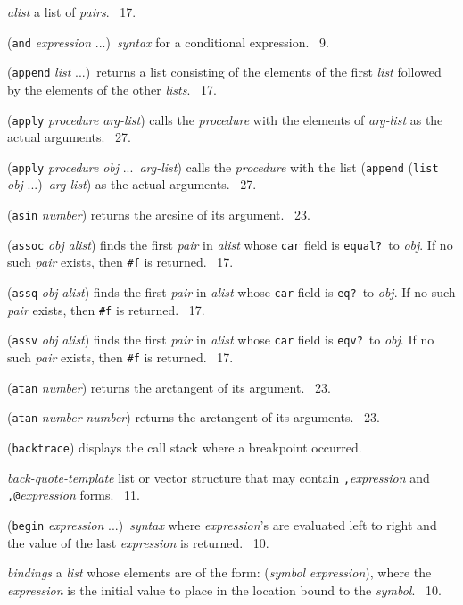 \documentclass[10pt,twocolumn]{article}
\begin{document}
\emph{alist} a list of \emph{pairs}.  \RRRRRS~17.

(\texttt{and} \emph{expression} ...)\ \emph{syntax} for a conditional
expression.  \RRRRRS~9.

(\texttt{append} \emph{list} ...)\ returns a list consisting of the
elements of the first \emph{list} followed by the elements of the
other \emph{lists}.  \RRRRRS~17.

(\texttt{apply} \emph{procedure} \emph{arg-list}) calls the
\emph{procedure} with the elements of \emph{arg-list} as the actual
arguments.  \RRRRRS~27.

(\texttt{apply} \emph{procedure} \emph{obj} ...\ \emph{arg-list})
calls the \emph{procedure} with the list (\texttt{append}
(\texttt{list} \emph{obj} ...)\ \emph{arg-list}) as the actual
arguments.  \RRRRRS~27.

(\texttt{asin} \emph{number}) returns the arcsine of its argument.
\RRRRRS~23.

(\texttt{assoc} \emph{obj} \emph{alist}) finds the first \emph{pair}
in \emph{alist} whose \texttt{car} field is \texttt{equal?}\ to
\emph{obj}.  If no such \emph{pair} exists, then \texttt{\#f} is
returned.  \RRRRRS~17.

(\texttt{assq} \emph{obj} \emph{alist}) finds the first \emph{pair} in
\emph{alist} whose \texttt{car} field is \texttt{eq?}\ to \emph{obj}.
If no such \emph{pair} exists, then \texttt{\#f} is returned.
\RRRRRS~17.

(\texttt{assv} \emph{obj} \emph{alist}) finds the first \emph{pair} in
\emph{alist} whose \texttt{car} field is \texttt{eqv?}\ to \emph{obj}.
If no such \emph{pair} exists, then \texttt{\#f} is returned.
\RRRRRS~17.

(\texttt{atan} \emph{number}) returns the arctangent of its argument.
\RRRRRS~23.

(\texttt{atan} \emph{number} \emph{number}) returns the arctangent of
its arguments.  \RRRRRS~23.

(\texttt{backtrace}) displays the call stack where a breakpoint
occurred.

\emph{back-quote-template} list or vector structure that may contain
\texttt{,}\emph{expression} and \texttt{,@}\emph{expression} forms.
\RRRRRS~11.

(\texttt{begin} \emph{expression} ...)\ \emph{syntax} where
\emph{expression}'s are evaluated left to right and the value of the
last \emph{expression} is returned. \RRRRRS~10.

\emph{bindings} a \emph{list} whose elements are of the form:
(\emph{symbol} \emph{expression}), where the \emph{expression} is the
initial value to place in the location bound to the
\emph{symbol}. \RRRRRS~10.
\end{document}
